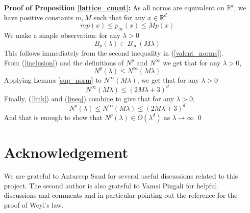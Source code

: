 \documentclass[11pt,lettersize,reqno,fullpage]{amsart}
\begin{document}
\noindent\textbf{Proof of Proposition \ref{lattice_count}:}
	As all norms are equivalent on $\mathbb{R}^d$, we have positive constants $m,M$ such that for any $x \in \mathbb{R}^d$
	\begin{equation} 
		mp(x) \leq p_{\infty}(x) \leq Mp(x) \label{valent_norms}
	\end{equation}
	We make a simple observation: for any $\lambda > 0$ 
	\begin{equation}
		B_p(\lambda) \subset B_{\infty}(M\lambda) \label{inclusion}
	\end{equation}
	This follows immediately from the second inequality in (\ref{valent_norms}).
	\\From (\ref{inclusion}) and the definitions of $N^p$ and $N^{\infty}$ we get that  for any $\lambda > 0$, \begin{equation}
		N^p(\lambda) \leq N^{\infty}(M\lambda)
		\label{link}
	\end{equation}
	Applying Lemma \ref{sup_norm} to $N^{\infty}(M\lambda)$, we get that for any $\lambda > 0$
	\begin{equation}
		N^{\infty}(M\lambda) \leq (2M\lambda + 3) ^d
		\label{ineq}
	\end{equation}
	Finally, (\ref{link}) and (\ref{ineq}) combine to give that for any $\lambda > 0$, \[N^p(\lambda) \leq N^{\infty}(M\lambda) \leq  (2M\lambda +3)^d\]
	And that is enough to show that  $N^p(\lambda) \in O(\lambda ^d)$ as $\lambda \to \infty$ \qed


\section{Acknowledgement} 
We are grateful to Antareep Saud for several useful discussions 
related to this project. 
The second author is also grateful to Vamsi Pingali for 
helpful discussions and comments and in particular pointing out the 
reference \cite{Getz_Ber} for the proof of Weyl's law.  
 

% 
%


% 
%
\end{document}
